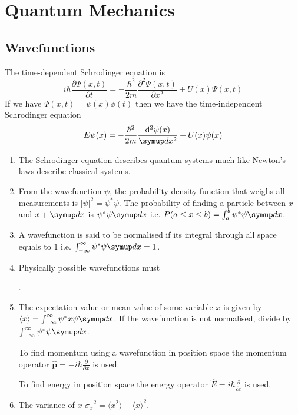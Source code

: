 \chapter{Quantum Mechanics}
\section{Wavefunctions}
The time-dependent Schrodinger equation is \[i\hbar\frac{\partial\Psi(x,t)}{\partial t} = -\frac{\hbar^2}{2m}\frac{\partial^2\Psi(x,t)}{\partial x^2} + U(x)\Psi(x,t)\] If we have \(\Psi(x,t) = \psi(x)\phi(t)\) then we have the time-independent Schrodinger equation \[E\psi(x) = -\frac{\hbar^2}{2m}\frac{\mathrm{d}^2\psi(x)}{\sld{x^2}} + U(x)\psi(x)\]
\begin{enumerate}
    \item The Schrodinger equation describes quantum systems much like Newton's laws describe classical systems.
    \item From the wavefunction \(\psi\), the probability density function that weighs all measurements is \(\left|\psi\right|^2 = \psi^*\psi\). The probability of finding a particle between \(x\) and \(x + \sld{x}\) is \(\psi^*\psi\sld{x}\) i.e. \(P(a \leq x \leq b) = \int_a^b\psi^*\psi\sld{x}\).
    \item A wavefunction is said to be normalised if its integral through all space equals to \(1\) i.e. \(\int^\infty_{-\infty}\psi^*\psi\sld{x} = 1\).
    \item Physically possible wavefunctions must .
    \item The expectation value or mean value of some variable \(x\) is given by \(\langle x\rangle = \int_{-\infty}^{\infty}\psi^*x\psi\sld{x}\). If the wavefunction is not normalised, divide by \(\int_{-\infty}^{\infty}\psi^*\psi\sld{x}\).
    
    To find momentum using a wavefunction in position space the momentum operator \(\mathbf{\hat{p}} = -i\hbar\frac{\partial}{\partial x}\) is used.
    
    To find energy in position space the energy operator \(\hat{E} = i\hbar\frac{\partial}{\partial t}\) is used.
    \item The variance of \(x\) \({\sigma_x}^2 = \langle x^2\rangle - \langle x\rangle^2\).
\end{enumerate}
